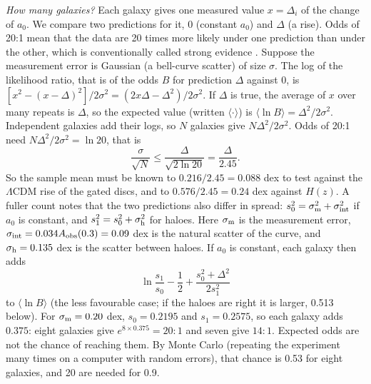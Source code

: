 \documentclass[fleqn,usenatbib]{mnras}
\begin{document}
\emph{How many galaxies?} Each galaxy gives one measured value $x=\Delta_i$ of the change of $a_0$. We compare two predictions for it, $0$ (constant $a_0$) and $\Delta$ (a rise). Odds of 20:1 mean that the data are 20 times more likely under one prediction than under the other, which is conventionally called strong evidence \citep{KassRaftery1995}. Suppose the measurement error is Gaussian (a bell-curve scatter) of size $\sigma$. The log of the likelihood ratio, that is of the odds $B$ for prediction $\Delta$ against $0$, is $[x^2-(x-\Delta)^2]/2\sigma^2=(2x\Delta-\Delta^2)/2\sigma^2$. If $\Delta$ is true, the average of $x$ over many repeats is $\Delta$, so the expected value (written $\langle\cdot\rangle$) is $\langle\ln B\rangle=\Delta^2/2\sigma^2$. Independent galaxies add their logs, so $N$ galaxies give $N\Delta^2/2\sigma^2$. Odds of 20:1 need $N\Delta^2/2\sigma^2=\ln20$, that is
\begin{equation}
\frac{\sigma}{\sqrt N}\le\frac{\Delta}{\sqrt{2\ln20}}=\frac{\Delta}{2.45}.
\end{equation}
So the sample mean must be known to $0.216/2.45=0.088$ dex to test against the $\Lambda$CDM rise of the gated discs, and to $0.576/2.45=0.24$ dex against $H(z)$. A fuller count notes that the two predictions also differ in spread: $s_0^2=\sigma_{\rm m}^2+\sigma_{\rm int}^2$ if $a_0$ is constant, and $s_1^2=s_0^2+\sigma_{\rm h}^2$ for haloes. Here $\sigma_{\rm m}$ is the measurement error, $\sigma_{\rm int}=0.034A_{\rm obs}(0.3)=0.09$ dex is the natural scatter of the curve, and $\sigma_{\rm h}=0.135$ dex is the scatter between haloes. If $a_0$ is constant, each galaxy then adds
\begin{equation}
\ln\frac{s_1}{s_0}-\frac12+\frac{s_0^2+\Delta^2}{2s_1^2}
\end{equation}
to $\langle\ln B\rangle$ (the less favourable case; if the haloes are right it is larger, 0.513 below). For $\sigma_{\rm m}=0.20$ dex, $s_0=0.2195$ and $s_1=0.2575$, so each galaxy adds $0.375$: eight galaxies give $e^{8\times0.375}=20:1$ and seven give $14:1$. Expected odds are not the chance of reaching them. By Monte Carlo (repeating the experiment many times on a computer with random errors), that chance is 0.53 for eight galaxies, and 20 are needed for 0.9.
\end{document}
